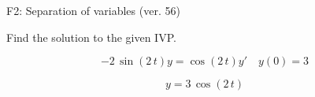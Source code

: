 \begin{exercise}
  \begin{exerciseTitle}F2: Separation of variables (ver. 56)\end{exerciseTitle}
  \begin{exerciseStatement}
    
Find the solution to the given IVP.

    
\[-2 \, \sin\left(2 \, t\right) y= \cos\left(2 \, t\right) y'\hspace{1em} y\left( 0 \right)= 3\]

  \end{exerciseStatement}
  \begin{exerciseAnswer}
    
\[y= 3 \, \cos\left(2 \, t\right)\]

  \end{exerciseAnswer}
\end{exercise}